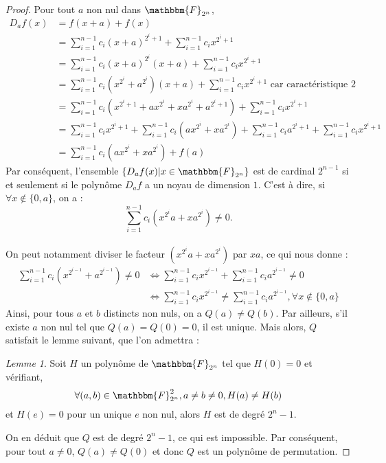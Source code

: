 \documentclass[12pt]{article}
\theoremstyle{remark}\newtheorem{note}{Note}
\theoremstyle{remark}\newtheorem{nota}{Notation}
\newcommand{\F}{\mathbbm{F}}
\newtheorem{lemma}{Lemme}
\theoremstyle{definition}
\begin{document}
\begin{proof}
Pour tout $a$ non nul dans $\F_{2^n}$,
\begin{align*}
D_af(x) &= f(x+a) + f(x)\\
&= \displaystyle\sum_{i=1}^{n-1} c_i(x+a)^{2^i+1}+\sum_{i=1}^{n-1} c_ix^{2^i+1}\\
&= \displaystyle\sum_{i=1}^{n-1} c_i(x+a)^{2^i}(x+a)+\sum_{i=1}^{n-1} c_ix^{2^i+1}\\
&= \displaystyle\sum_{i=1}^{n-1} c_i(x^{2^i}+a^{2^i})(x+a)+\sum_{i=1}^{n-1} c_ix^{2^i+1} \text{   car caractéristique 2}\\
&= \displaystyle\sum_{i=1}^{n-1} c_i(x^{2^i+1}+ax^{2^i}+xa^{2^i}+a^{2^i+1})+\sum_{i=1}^{n-1} c_ix^{2^i+1} \\
&= \displaystyle\sum_{i=1}^{n-1} c_ix^{2^i+1}+\displaystyle\sum_{i=1}^{n-1} c_i(ax^{2^i}+xa^{2^i})+\displaystyle\sum_{i=1}^{n-1} c_i a^{2^i+1}+\sum_{i=1}^{n-1} c_ix^{2^i+1} \\
&=  \displaystyle\sum_{i=1}^{n-1} c_i(ax^{2^i}+xa^{2^i})+f(a)
\end{align*}
Par conséquent, l'ensemble $\lbrace D_af(x)|x \in \F_{2^n} \rbrace$ est de cardinal $2^{n-1}$ si et seulement si le polynôme $D_af$ a un noyau de dimension $1$. C'est à dire, si $\forall x \notin \lbrace 0,a \rbrace$, on a : 
$$\displaystyle \sum_{i=1}^{n-1} c_i \left( x^{2^i}a+xa^{2^i} \right) \neq 0.$$
\\
On peut notamment diviser le facteur $\left( x^{2^i} a+xa^{2^i} \right)$ par $xa$, ce qui nous donne :
\begin{align*}
\displaystyle \sum_{i=1}^{n-1} c_i \left( x^{2^{i-1}}+a^{2^{i-1}} \right) \neq 0 
&\Leftrightarrow \displaystyle \sum_{i=1}^{n-1} c_i x^{2^{i-1}} + \displaystyle \sum_{i=1}^{n-1} c_i a^{2^{i-1}} \neq 0 \\ 
&\Leftrightarrow \displaystyle \sum_{i=1}^{n-1} c_i x^{2^{i-1}} \neq \displaystyle \sum_{i=1}^{n-1} c_i a^{2^{i-1}},\forall x \notin \lbrace 0,a \rbrace
\end{align*}
Ainsi, pour tous $a$ et $b$ distincts non nuls, on a $Q(a) \neq Q(b)$. Par ailleurs, s'il existe $a$ non nul tel que $Q(a)=Q(0)=0$, il est unique. Mais alors, $Q$ satisfait le lemme suivant, que l'on admettra :
\begin{lemma}
Soit $H$ un polynôme de $\F_{2^n}$ tel que $H(0)=0$ et vérifiant,
$$\forall (a,b) \in \F_{2^n}^2, a\neq b \neq 0, H(a) \neq H(b)$$ 
et $H(e)=0$ pour un unique $e$ non nul, alors $H$ est de degré $2^{n}-1$.
\end{lemma}
On en déduit que $Q$ est de degré $2^n-1$, ce qui est impossible. Par conséquent, pour tout $a \neq 0$, $Q(a) \neq Q(0)$ et donc $Q$ est un polynôme de permutation.
\end{proof}
\end{document}
